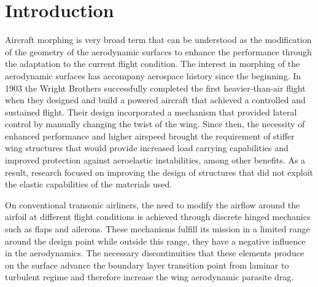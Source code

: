 \chapter{Introduction} \label{chap:introduction}


Aircraft morphing is very broad term that can be understood as the modification of the geometry of the aerodynamic surfaces to enhance the performance through the adaptation to the current flight condition. The interest in morphing of the aerodynamic surfaces has accompany aerospace history since the beginning. In 1903 the Wright Brothers successfully completed the first heavier-than-air flight when they designed and build a powered aircraft that achieved a controlled and sustained flight. Their design incorporated a mechanism that provided lateral control by manually changing the twist of the wing. Since then, the necessity of enhanced performance and higher airspeed brought the requirement of stiffer wing structures that would provide increased load carrying capabilities and improved protection against aeroelastic instabilities, among other benefits. As a result, research focused on improving the design of structures that did not exploit the elastic capabilities of the materials used.

On conventional transonic airliners, the need to modify the airflow around the airfoil at different flight conditions is achieved through discrete hinged mechanics such as flaps and ailerons. These mechanisms fulfill its mission in a limited range around the design point while outside this range, they have a negative influence in the aerodynamics. The necessary discontinuities that these elements produce on the surface advance the boundary layer transition point from laminar to turbulent regime and therefore increase the wing aerodynamic parasite drag. 

